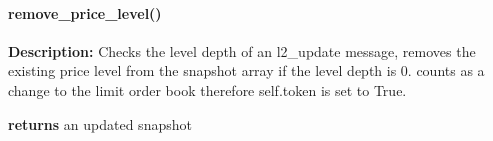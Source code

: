 \paragraph{remove\_price\_level()}
\hfill \break
\textbf{Description:} Checks the level depth of an l2\_update message, removes the existing price level from the snapshot array if the level depth is 0. 
counts as a change to the limit order book therefore self.token is set to True.

\textbf{returns} an updated snapshot 